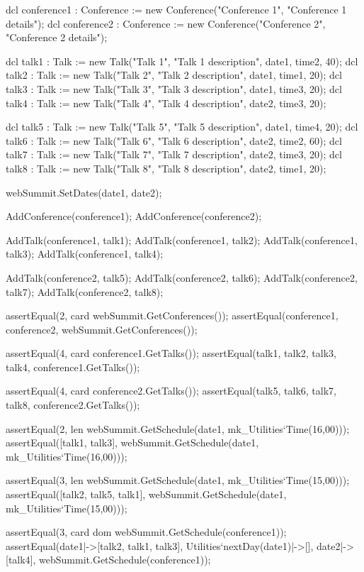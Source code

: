 \begin{vdmpp}[breaklines=true]
  dcl conference1 : Conference := new Conference("Conference 1", "Conference 1 details");
  dcl conference2 : Conference := new Conference("Conference 2", "Conference 2 details");
  
  dcl talk1 : Talk := new Talk("Talk 1", "Talk 1 description", date1, time2, 40);
  dcl talk2 : Talk := new Talk("Talk 2", "Talk 2 description", date1, time1, 20); 
  dcl talk3 : Talk := new Talk("Talk 3", "Talk 3 description", date1, time3, 20);
  dcl talk4 : Talk := new Talk("Talk 4", "Talk 4 description", date2, time3, 20);
 
  dcl talk5 : Talk := new Talk("Talk 5", "Talk 5 description", date1, time4, 20);
  dcl talk6 : Talk := new Talk("Talk 6", "Talk 6 description", date2, time2, 60);
  dcl talk7 : Talk := new Talk("Talk 7", "Talk 7 description", date2, time3, 20);
  dcl talk8 : Talk := new Talk("Talk 8", "Talk 8 description", date2, time1, 20);
  
  webSummit.SetDates(date1, date2);
  
  AddConference(conference1);
  AddConference(conference2);
  
  AddTalk(conference1, talk1);
  AddTalk(conference1, talk2);
  AddTalk(conference1, talk3);
  AddTalk(conference1, talk4);
  
  AddTalk(conference2, talk5);
  AddTalk(conference2, talk6);
  AddTalk(conference2, talk7);
  AddTalk(conference2, talk8);
  
  assertEqual(2, card webSummit.GetConferences());
  assertEqual({conference1, conference2}, webSummit.GetConferences());
  
  assertEqual(4, card conference1.GetTalks());
  assertEqual({talk1, talk2, talk3, talk4}, conference1.GetTalks());
  
  assertEqual(4, card conference2.GetTalks());
  assertEqual({talk5, talk6, talk7, talk8}, conference2.GetTalks());
  
  assertEqual(2, len webSummit.GetSchedule(date1, mk_Utilities`Time(16,00)));
  assertEqual([talk1, talk3], webSummit.GetSchedule(date1, mk_Utilities`Time(16,00)));
  
  assertEqual(3, len webSummit.GetSchedule(date1, mk_Utilities`Time(15,00)));
  assertEqual([talk2, talk5, talk1], webSummit.GetSchedule(date1, mk_Utilities`Time(15,00)));
  
  assertEqual(3, card dom webSummit.GetSchedule(conference1));
  assertEqual({date1|->[talk2, talk1, talk3], Utilities`nextDay(date1)|->[], date2|->[talk4]}, webSummit.GetSchedule(conference1));
  

\end{vdmpp}
